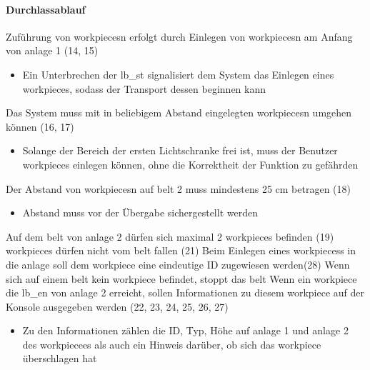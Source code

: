 \paragraph{Durchlassablauf}
\begin{itemize}
     Zuführung von \glspl{workpiece}n erfolgt durch Einlegen von \glspl{workpiece}n am Anfang von \gls{anlage} 1 (14, 15)
    \begin{itemize}
        \item Ein Unterbrechen der \gls{lb_st} signalisiert dem System das Einlegen eines \gls{workpiece}s,
        sodass der Transport dessen beginnen kann
    \end{itemize}
     Das System muss mit in beliebigem Abstand eingelegten \glspl{workpiece}n umgehen können (16, 17) %
    \begin{itemize}
        \item Solange der Bereich der ersten Lichtschranke frei ist, muss der Benutzer \glspl{workpiece}
        einlegen können, ohne die Korrektheit der Funktion zu gefährden
    \end{itemize}
     Der Abstand von \glspl{workpiece}n auf \gls{belt} 2 muss mindestens 25 cm betragen (18)
    \begin{itemize}
        \item Abstand muss vor der Übergabe sichergestellt werden
    \end{itemize}
     Auf dem \gls{belt} von \gls{anlage} 2 dürfen sich maximal 2 \glspl{workpiece} befinden (19)
     \Glspl{workpiece} dürfen nicht vom \gls{belt} fallen (21)
     Beim Einlegen eines \glspl{workpiece}s in die \gls{anlage} soll dem \gls{workpiece} eine eindeutige ID zugewiesen werden(28)
     Wenn sich auf einem \gls{belt} kein \gls{workpiece} befindet, stoppt das \gls{belt}
     Wenn ein \gls{workpiece} die \gls{lb_en} von \gls{anlage} 2 erreicht,
    sollen Informationen zu diesem \gls{workpiece} auf der Konsole ausgegeben werden (22, 23, 24, 25, 26, 27)
    \begin{itemize}
        \item Zu den Informationen zählen die ID, Typ, Höhe auf \gls{anlage} 1 und \gls{anlage} 2 des \gls{workpiece}es als
        auch ein Hinweis darüber, ob sich das \gls{workpiece} überschlagen hat
    \end{itemize}
\end{itemize}

